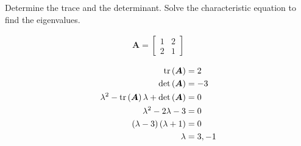 Determine the trace and the determinant. Solve the characteristic equation to find the eigenvalues.

\begin{align*}
    \boldsymbol{A} = \begin{bmatrix}
        1 & 2 \\
        2 & 1
    \end{bmatrix}
\end{align*}

\begin{solution}
    \begin{align*}
        \operatorname{tr}\left(\boldsymbol{A}\right) &= 2 \\
        \det\left(\boldsymbol{A}\right) &= -3 \\
        \lambda^2 - \operatorname{tr}\left(\boldsymbol{A}\right)\lambda + \det\left(\boldsymbol{A}\right) &= 0 \\
        \lambda^2 - 2\lambda - 3 &= 0 \\
        \left(\lambda - 3\right)\left(\lambda + 1\right) &= 0 \\
        \lambda &= 3, -1
    \end{align*}
\end{solution}